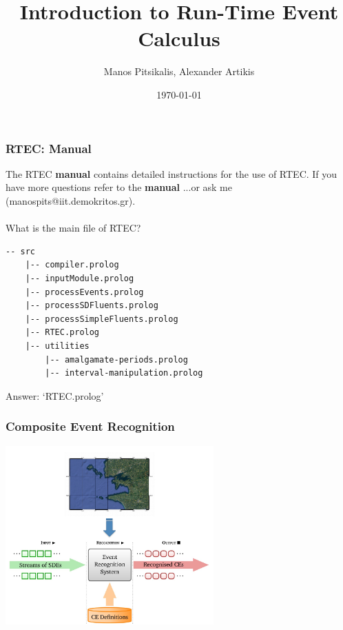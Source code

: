 \documentclass{beamer}
\title[RTEC]{Introduction to Run-Time Event Calculus} %
\author[]{Manos Pitsikalis, Alexander Artikis} %
\institute[NCSR `Demokritos'] %
{
Institute of Informatics \& Telecommunications\\
NCSR `Demokritos'\\%
\medskip
\textit{manospits@iit.demokritos.gr} %
}
\date{\today} %
\begin{document}
\begin{frame}
\titlepage %
\end{frame}


\begin{frame}[fragile]
 \frametitle{RTEC: Manual}
 The RTEC \textbf{manual} contains detailed instructions for the use of RTEC. If you have more questions refer to the \textbf{manual} ...or ask me (manospits@iit.demokritos.gr).\\
\pause
\hfill \\
What is the main file of RTEC?
\begin{lstlisting}[basicstyle=\tiny,]
 -- src
    |-- compiler.prolog
    |-- inputModule.prolog
    |-- processEvents.prolog
    |-- processSDFluents.prolog
    |-- processSimpleFluents.prolog
    |-- RTEC.prolog
    |-- utilities
        |-- amalgamate-periods.prolog
        |-- interval-manipulation.prolog
\end{lstlisting}

\pause
Answer: `RTEC.prolog'
\end{frame}



\begin{frame}
\frametitle{Composite Event Recognition}
\centering
\includegraphics[width=8cm]{./graphics/cer-mar}
\end{frame}

\end{document}
